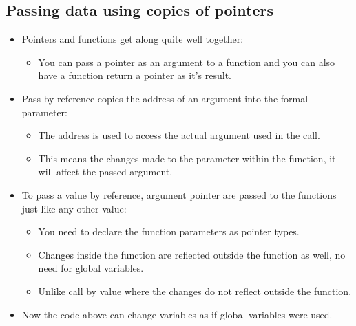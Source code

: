 \subsection{Passing data using copies of pointers}
\begin{itemize}
    \item Pointers and functions get along quite well together:
        \begin{itemize}
            \item You can pass a pointer as an argument to a function and you can also have a function return a pointer as it's result.
        \end{itemize}
    
    \item Pass by reference copies the address of an argument into the formal parameter:
        \begin{itemize}
            \item The address is used to access the actual argument used in the call.
            \item This means the changes made to the parameter within the function, it will affect the passed argument.
        \end{itemize}
    
    \item To pass a value by reference, argument pointer are passed to the functions just like any other value:
        \begin{itemize}
            \item You need to declare the function parameters as pointer types. 
            \item Changes inside the function are reflected outside the function as well, no need for global variables. 
            \item Unlike call by value where the changes do not reflect outside the function. 
        \end{itemize}
    
    \item Now the code above can change variables as if global variables were used.
\end{itemize}

